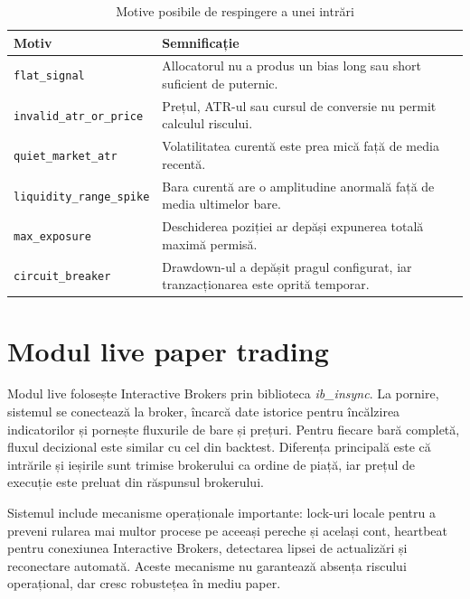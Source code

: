 \begin{table}[H]
    \centering
    \footnotesize
    \setlength{\tabcolsep}{4pt}
    \renewcommand{\arraystretch}{1.5}
    \caption{Motive posibile de respingere a unei intrări}
    \label{tabel:motive_respingere_risc}
    \begin{tabular}{|p{4.4cm}|p{7.6cm}|}
        \hline
        \textbf{Motiv} & \textbf{Semnificație} \\
        \hline
        \texttt{flat\_signal} & Allocatorul nu a produs un bias long sau short suficient de puternic. \\
        \hline
        \texttt{invalid\_atr\_or\_price} & Prețul, ATR-ul sau cursul de conversie nu permit calculul riscului. \\
        \hline
        \texttt{quiet\_market\_atr} & Volatilitatea curentă este prea mică față de media recentă. \\
        \hline
        \texttt{liquidity\_range\_spike} & Bara curentă are o amplitudine anormală față de media ultimelor bare. \\
        \hline
        \texttt{max\_exposure} & Deschiderea poziției ar depăși expunerea totală maximă permisă. \\
        \hline
        \texttt{circuit\_breaker} & Drawdown-ul a depășit pragul configurat, iar tranzacționarea este oprită temporar. \\
        \hline
    \end{tabular}
    \renewcommand{\arraystretch}{1.0}
\end{table}

\section{Modul live paper trading}
\label{cap:cap3:live}

Modul live folosește Interactive Brokers prin biblioteca \textit{ib\_insync}. La pornire, sistemul se conectează la broker, încarcă date istorice pentru încălzirea indicatorilor și pornește fluxurile de bare și prețuri. Pentru fiecare bară completă, fluxul decizional este similar cu cel din backtest. Diferența principală este că intrările și ieșirile sunt trimise brokerului ca ordine de piață, iar prețul de execuție este preluat din răspunsul brokerului.

Sistemul include mecanisme operaționale importante: lock-uri locale pentru a preveni rularea mai multor procese pe aceeași pereche și același cont, heartbeat pentru conexiunea Interactive Brokers, detectarea lipsei de actualizări și reconectare automată. Aceste mecanisme nu garantează absența riscului operațional, dar cresc robustețea în mediu paper.

